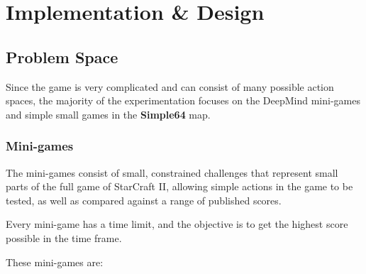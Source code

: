 \chapter{Implementation \& Design}%
\label{implem}

\section{Problem Space}
Since the game is very complicated and can consist of many possible action spaces,
the majority of the experimentation focuses on the DeepMind mini-games
and simple small games in the \textbf{Simple64} map.

\subsection{Mini-games}

The mini-games consist of small, constrained challenges that represent
small parts of the full game of StarCraft II, allowing simple actions
in the game to be tested, as well as compared against a range of
published scores.

Every mini-game has a time limit, and the objective is to get the
highest score possible in the time frame.

These mini-games are:

